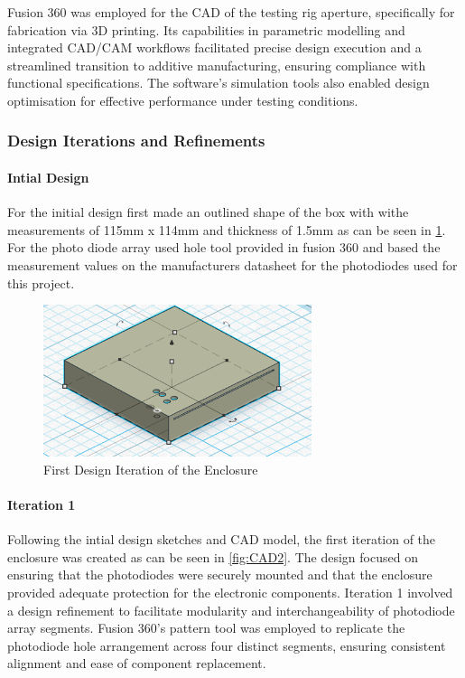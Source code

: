 Fusion 360 was employed for the CAD of the testing rig aperture, specifically for fabrication via 3D printing. 
Its capabilities in parametric modelling and integrated CAD/CAM workflows facilitated precise design execution and a streamlined transition to additive manufacturing, ensuring compliance with functional specifications. 
The software's simulation tools also enabled design optimisation for effective performance under testing conditions.

\subsubsection{Design Iterations and Refinements}
\paragraph{Intial Design}

For the initial design first made an outlined shape of the box with withe measurements of 115mm x 114mm and thickness of 1.5mm as can be seen in \ref{fig:CAD1}.
For the photo diode array used hole tool provided in fusion 360 and based the measurement values on the manufacturers datasheet for the photodiodes used for this project.



\begin{figure}[htbp]
    \centering
    \includegraphics[width=0.7\textwidth]{figures/CAD-3DPrint/FirstIteration.png}
    \caption{First Design Iteration of the Enclosure}
    \label{fig:CAD1}
\end{figure}


\paragraph{Iteration 1}

Following the intial design sketches and CAD model, the first iteration of the enclosure was created as can be seen in \ref{fig:CAD2}.
The design focused on ensuring that the photodiodes were securely mounted and that the enclosure provided adequate protection for the electronic components. 
Iteration 1 involved a design refinement to facilitate modularity and interchangeability of photodiode array segments. 
Fusion 360's pattern tool was employed to replicate the photodiode hole arrangement across four distinct segments, ensuring consistent alignment and ease of component replacement.

